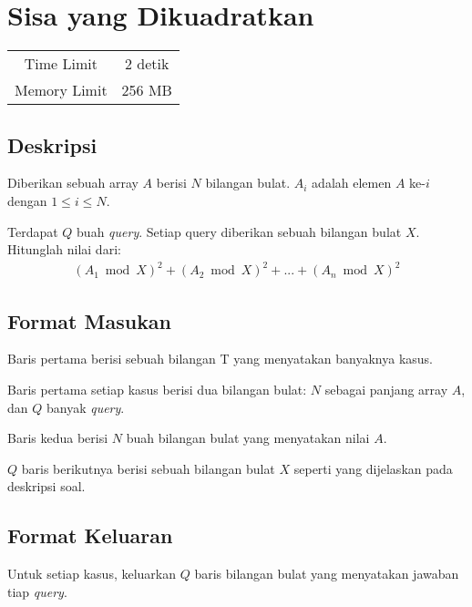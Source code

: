 \documentclass{article}
\begin{document}
\section*{\hfil Sisa yang Dikuadratkan\hfil}

\begin{center}
\begin{tabular}{ |cc| } 
 \hline
 Time Limit & 2 detik \\ 
 Memory Limit & 256 MB \\
 \hline
\end{tabular}
\end{center}

\subsection*{Deskripsi}

\par Diberikan sebuah array $A$ berisi $N$ bilangan bulat. $A_{i}$ adalah elemen $A$ ke-$i$ dengan $1 \leq i \leq N$.

\par Terdapat $Q$ buah \textit{query}. Setiap query diberikan sebuah bilangan bulat $X$. Hitunglah nilai dari:
\begin{gather*} 
(A_{1} \bmod X)^2 + (A_{2} \bmod X)^2 + ... + (A_{n} \bmod X)^2
\end{gather*} 

\subsection*{Format Masukan}
\par Baris pertama berisi sebuah bilangan T yang menyatakan banyaknya kasus.
\par Baris pertama setiap kasus berisi dua bilangan bulat: $N$ sebagai panjang array $A$, dan $Q$ banyak \textit{query}.
\par Baris kedua berisi $N$ buah bilangan bulat yang menyatakan nilai $A$.
\par $Q$ baris berikutnya berisi sebuah bilangan bulat $X$ seperti yang dijelaskan pada deskripsi soal.

\subsection*{Format Keluaran}

\par Untuk setiap kasus, keluarkan $Q$ baris bilangan bulat yang menyatakan jawaban tiap \textit{query}.
\end{document}
